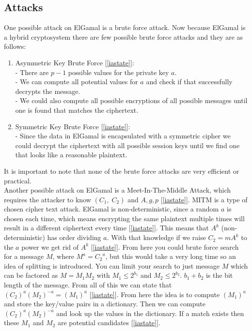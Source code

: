 \documentclass[12pt]{article}
\begin{document}
\subsection{Attacks}
One possible attack on ElGamal is a brute force attack. Now because ElGamal is a hybrid cryptosystem there are few possible brute force attacks and they are as follows:
\begin{enumerate}
  \item Asymmetric Key Brute Force [\ref{iastate}]: \\
    - There are $p-1$ possible values for the private key $a$.\\
    - We can compute all potential values for $a$ and check if that successfully decrypts the message.\\
    - We could also compute all possible encryptions of all possible messages until one is found that matches the ciphertext.
  \item Symmetric Key Brute Force [\ref{iastate}]:\\
    - Since the data in ElGamal is encapsulated with a symmetric cipher we could decrypt the ciphertext with all possible session keys until we find one that looks like a reasonable plaintext.
\end{enumerate}
It is important to note that none of the brute force attacks are very efficient or practical.\vspace{5mm}\\ Another possible attack on ElGamal is a Meet-In-The-Middle Attack, which requires the attacker to know $(C_1,\;C_2)$ and $A,g,p$ [\ref{iastate}]. MITM is a type of chosen cipher text attack. ElGamal is non-deterministic, since a random $a$ is chosen each time, which means encrypting the same plaintext multiple times will result in a different ciphertext every time [\ref{iastate}]. This means that $A^k$ (non-deterministic) has order dividing $a$. With that knowledge if we raise $C_2=mA^k$ to the $a$ power we get rid of $A^k$ [\ref{iastate}]. From here you could brute force search for a message $M$, where $M^a={C_2}^a$, but this would take a very long time so an idea of splitting is introduced. You can limit your search to just message $M$ which can be factored as $M=M_1M_2$ with $M_1\leq2^{b_1}$ and $M_2\leq2^{b_2}$. $b_1+b_2$ is the bit length of the message. From all of this we can state that $(C_2)^a(M_2)^{-a}=(M_1)^a$ [\ref{iastate}]. From here the idea is to compute $(M_1)^a$ and store the key/value pairs in a dictionary. Then we can compute $(C_2)^a(M_2)^{-a}$ and look up the values in the dictionary. If a match exists then these $M_1$ and $M_2$ are potential candidates [\ref{iastate}].     
\end{document}
